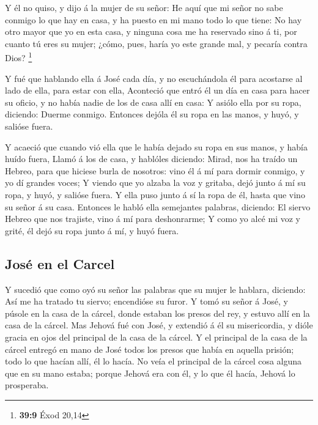  Y él no quiso, y dijo á la mujer de su señor: He aquí que
mi señor no sabe conmigo lo que hay en casa, y ha puesto en mi mano todo
lo que tiene:  No hay otro mayor que yo en esta casa, y
ninguna cosa me ha reservado sino á ti, por cuanto tú eres su mujer;
¿cómo, pues, haría yo este grande mal, y pecaría contra Dios?
\footnote{\textbf{39:9} Éxod 20,14}

 Y fué que hablando ella á José cada día, y no
escuchándola él para acostarse al lado de ella, para estar con ella,
 Aconteció que entró él un día en casa para hacer su
oficio, y no había nadie de los de casa allí en casa:  Y
asiólo ella por su ropa, diciendo: Duerme conmigo. Entonces dejóla él su
ropa en las manos, y huyó, y salióse fuera.

 Y acaeció que cuando vió ella que le había dejado su
ropa en sus manos, y había huído fuera,  Llamó á los de
casa, y hablóles diciendo: Mirad, nos ha traído un Hebreo, para que
hiciese burla de nosotros: vino él á mí para dormir conmigo, y yo dí
grandes voces;  Y viendo que yo alzaba la voz y gritaba,
dejó junto á mí su ropa, y huyó, y salióse fuera.  Y ella
puso junto á sí la ropa de él, hasta que vino su señor á su casa.
 Entonces le habló ella semejantes palabras, diciendo: El
siervo Hebreo que nos trajiste, vino á mí para deshonrarme;
 Y como yo alcé mi voz y grité, él dejó su ropa junto á
mí, y huyó fuera.

\hypertarget{josuxe9-en-el-carcel}{%
\subsection{José en el Carcel}\label{josuxe9-en-el-carcel}}

 Y sucedió que como oyó su señor las palabras que su
mujer le hablara, diciendo: Así me ha tratado tu siervo; encendióse su
furor.  Y tomó su señor á José, y púsole en la casa de la
cárcel, donde estaban los presos del rey, y estuvo allí en la casa de la
cárcel.  Mas Jehová fué con José, y extendió á él su
misericordia, y dióle gracia en ojos del principal de la casa de la
cárcel.  Y el principal de la casa de la cárcel entregó
en mano de José todos los presos que había en aquella prisión; todo lo
que hacían allí, él lo hacía.  No veía el principal de la
cárcel cosa alguna que en su mano estaba; porque Jehová era con él, y lo
que él hacía, Jehová lo prosperaba.

